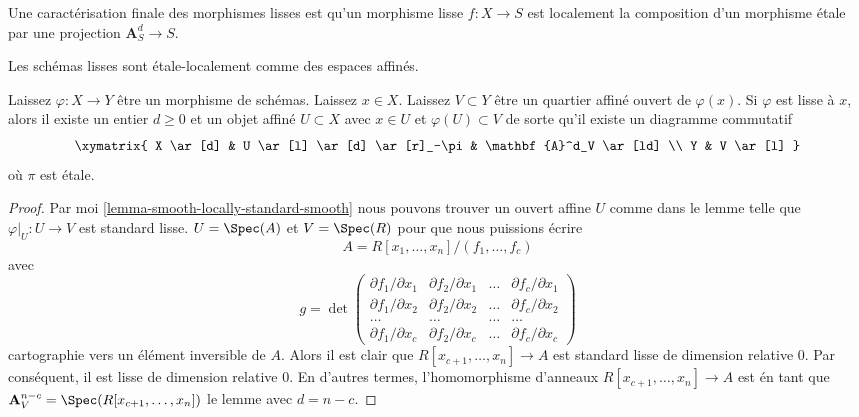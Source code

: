 \noindent
Une caractérisation finale des morphismes lisses est qu'un morphisme lisse $f : X \to S$ est localement la composition d'un morphisme \'etale par une projection $\mathbf{A}_S^d \to S$.

\begin{lemma}

\label{lemma-smooth-etale-over-affine-space}

\begin{slogan}
Les schémas lisses sont \'etale-localement comme des espaces affinés.
\end{slogan}
Laissez $\varphi : X \to Y$ être un morphisme de schémas. Laissez $x \in X$. Laissez $V \subset Y$ être un quartier affiné ouvert de $\varphi(x)$. Si $\varphi$ est lisse à $x$, alors il existe un entier $d \geq 0$ et un objet affiné $U \subset X$ avec $x \in U$ et $\varphi(U) \subset V$ de sorte qu'il existe un diagramme commutatif $$
\xymatrix{
X \ar[d] & U \ar[l] \ar[d] \ar[r]_-\pi & \mathbf{A}^d_V \ar[ld] \\
Y & V \ar[l]
}
$$ où $\pi$ est \'etale.
\end{lemma}

\begin{proof}

Par moi \ref{lemma-smooth-locally-standard-smooth}
nous pouvons trouver un ouvert affine $U$ comme dans le lemme telle que
$\varphi|_U : U \to V$ est standard lisse.
$U = \Spec(A)$ et $V = \Spec(R)$ pour que nous puissions écrire
$$
A = R[x_1, \ldots, x_n]/(f_1, \ldots, f_c)
$$
avec
$$
g =
\det
\left(
\begin{matrix}
\partial f_1/\partial x_1 &
\partial f_2/\partial x_1 &
\ldots &
\partial f_c/\partial x_1 \\
\partial f_1/\partial x_2 &
\partial f_2/\partial x_2 &
\ldots &
\partial f_c/\partial x_2 \\
\ldots & \ldots & \ldots & \ldots \\
\partial f_1/\partial x_c &
\partial f_2/\partial x_c &
\ldots &
\partial f_c/\partial x_c
\end{matrix}
\right)
$$
cartographie vers un élément inversible de $A$. Alors il est clair que
$R[x_{c + 1}, \ldots, x_n] \to A$ est standard lisse de dimension relative $0$. Par conséquent, il est lisse de dimension relative $0$. En d'autres termes, l'homomorphisme d'anneaux $R[x_{c + 1}, \ldots, x_n] \to A$
est \'en tant que $\mathbf{A}^{n - c}_V = \Spec(R[x_{c + 1}, \ldots, x_n])$
le lemme avec $d = n - c$.

\end{proof}
















